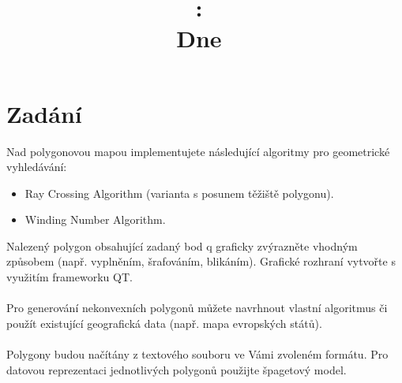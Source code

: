 \documentclass{article}
\title{
\vspace{2in}
\textmd{\textbf{\hmwkClass:\ \hmwkTitle}}\\
\normalsize\vspace{0.1in}\small{Dne\ \hmwkDueDate}\\
\vspace{0.1in}\large{\textit{\hmwkClassInstructor}}
\vspace{3in}
}
\author{\textbf{\hmwkAuthorName}}
\date{} %
\begin{document}
\maketitle


\setcounter{tocdepth}{1} %

\newpage
\tableofcontents
\newpage





\section{Zadání}
Nad polygonovou mapou implementujete následující algoritmy pro geometrické vyhledávání:\\
\begin{itemize}
\item Ray Crossing Algorithm (varianta s posunem těžiště polygonu).
\item Winding Number Algorithm.
\end{itemize}

Nalezený polygon obsahující zadaný bod q graficky zvýrazněte vhodným způsobem (např. vyplněním, šrafováním,
blikáním). Grafické rozhraní vytvořte s využitím frameworku QT.\\
\\
Pro generování nekonvexních polygonů můžete navrhnout vlastní algoritmus či použít existující geografická data
(např. mapa evropských států).\\
\\
Polygony budou načítány z textového souboru ve Vámi zvoleném formátu. Pro datovou reprezentaci jednotlivých
polygonů použijte špagetový model.\\
\\
\end{document}
